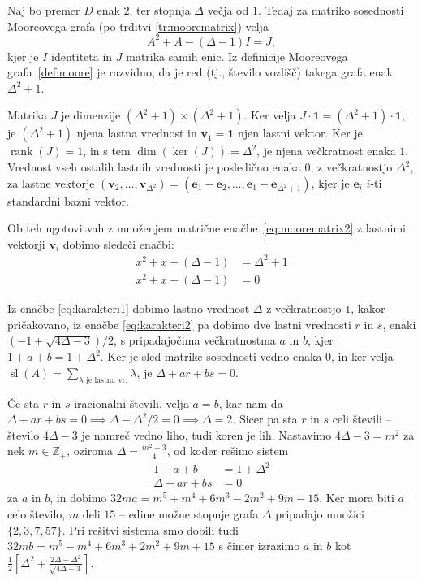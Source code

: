 \documentclass[fin1, tisk]{fmfdelo}
\newcommand{\ZZ}{\mathbb{Z}}
\newcommand{\rank}{\operatorname{rank}}
\newcommand{\sled}{\operatorname{sl}}
\begin{document}
\begin{dokaz}
    Naj bo premer $D$ enak $2$, ter stopnja $\Delta$ večja od $1$. Tedaj za matriko 
    sosednosti Mooreovega grafa (po trditvi \ref{tr:moorematrix}) velja
    \begin{equation}\label{eq:moorematrix2}
    A^2 + A - (\Delta-1)I = J,
    \end{equation}
    kjer je $I$ identiteta in $J$ matrika samih enic.
    Iz definicije Mooreovega grafa~\ref{def:moore} je razvidno, da je red (tj., število vozlišč) takega grafa enak
    $\Delta^2 + 1$.

    Matrika $J$ je dimenzije $(\Delta^2 + 1) \times (\Delta^2 + 1)$.
    Ker velja $J\cdot\mathbf{1} = (\Delta^2 + 1)\cdot\mathbf{1}$, je $(\Delta^2 + 1)$ njena 
    lastna vrednost in $\mathbf{v}_1 = \mathbf{1}$ njen lastni vektor. 
    Ker je $\rank(J) = 1$, in s tem $\dim(\ker(J)) = \Delta^2$, je njena večkratnost enaka $1$.
    Vrednost vseh ostalih lastnih vrednosti je posledično enaka
    $0$, z večkratnostjo $\Delta^2$,
    za lastne vektorje 
    $(\mathbf{v}_2, \ldots, \mathbf{v}_{\Delta^2}) = (\mathbf{e}_1 - \mathbf{e}_2, \ldots, \mathbf{e}_1 - \mathbf{e}_{\Delta^2 + 1})$,
    kjer je $\mathbf{e}_i$ $i$-ti standardni bazni vektor.

    Ob teh ugotovitvah z množenjem matrične enačbe~\ref{eq:moorematrix2} z 
    lastnimi vektorji $\mathbf{v}_i$ dobimo sledeči enačbi:
    \begin{align}
    x^2 + x - (\Delta - 1) &= \Delta^2 + 1 \label{eq:karakteri1}\\
    x^2 + x - (\Delta - 1) &= 0 \label{eq:karakteri2}
    \end{align}


    Iz enačbe \ref{eq:karakteri1} dobimo lastno vrednost $\Delta$ z večkratnostjo $1$, kakor pričakovano,
    iz enačbe \ref{eq:karakteri2} pa dobimo dve lastni 
    vrednosti $r$ in $s$, enaki $(-1 \pm \sqrt{4\Delta - 3})/2$, s pripadajočima večkratnostma $a$ in $b$, 
    kjer $1 + a + b = 1 + \Delta^2$.
    Ker je sled matrike sosednosti vedno enaka $0$, in ker velja 
    $\sled(A) = \sum_{\lambda \text{ je lastna vr.}} \lambda$,
    je $\Delta + a r + b s = 0$.

    Če sta $r$ in $s$ iracionalni števili, velja $a = b$, kar nam da
    $\Delta + a r + b s = 0 \implies \Delta - \Delta^2 / 2 = 0 \implies \Delta = 2$.
    Sicer pa sta $r$ in $s$ celi števili -- število $4\Delta - 3$ je namreč vedno liho, 
    tudi koren je lih. Nastavimo $4\Delta - 3 = m^2$ za nek $m \in \ZZ_+$, 
    oziroma $\Delta = \frac{m^2 + 3}{4}$, od koder rešimo sistem
    \begin{align*}
        1 + a + b &= 1 + \Delta^2 \\
        \Delta + a r + b s &= 0
    \end{align*}
    za $a$ in $b$, in dobimo $32 ma = m^5 + m^4 + 6m^3 - 2m^2 + 9m - 15$.
    Ker mora biti $a$ celo število, $m$ deli $15$ -- edine možne stopnje grafa $\Delta$ pripadajo
    množici $\{2, 3, 7, 57\}$.
    Pri rešitvi sistema smo dobili tudi $32 mb = m^5 - m^4 + 6 m^3 + 2 m^2 + 9m + 15$
    s čimer izrazimo $a$ in $b$ kot 
    $\frac{1}{2} [\Delta^2 \mp \frac{2\Delta - \Delta^2}{\sqrt{4\Delta - 3}}]$.
\end{dokaz}
\end{document}
